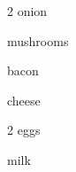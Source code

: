 \begin{ingredient}
    \begin{main}
        \item 2 onion
        \item mushrooms
        \item bacon
        \item {} cheese
        \item 2 eggs
        \item {} milk
    \end{main}
\end{ingredient}
\begin{recipe}
    \step{}
\end{recipe}